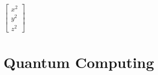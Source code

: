 \documentclass[12pt]{article}
\begin{document}
\noindent
$\begin{bmatrix}x^2\\y^2\\z^2\end{bmatrix}$

\newpage



















\newpage

\section{Quantum Computing}



\newpage



\newpage


\end{document}
